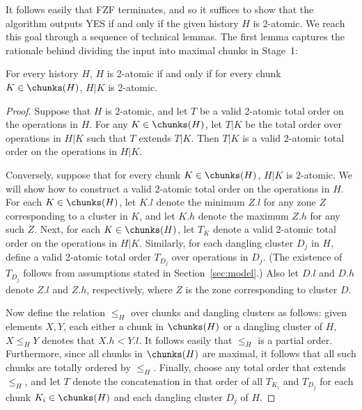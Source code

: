 



It follows easily that FZF terminates, and so it suffices to show that
the algorithm outputs YES if and only if the given history $H$ is 2-atomic.
We reach this goal through a sequence of technical lemmas.
The first lemma captures the rationale behind dividing the input into
maximal chunks in Stage~1:

\begin{lemma}
  \label{lemma:subdivide}
  For every history $H$, $H$ is 2-atomic if and only if for every chunk
  $K \in \chunks(H)$, $H|K$ is 2-atomic.
\begin{proof} Suppose that $H$ is 2-atomic, and let $T$ be a valid 2-atomic total order
on the operations in $H$.
For any $K \in \chunks(H)$, let $T|K$ be the total order over operations
in $H|K$ such that $T$ extends $T|K$.
Then $T|K$ is a valid 2-atomic total order on the operations in $H|K$.


Conversely, suppose that for every chunk $K \in \chunks(H)$, $H|K$ is 2-atomic.
We will show how to construct a valid 2-atomic total order on the operations in $H$.
For each $K \in \chunks(H)$, let $K.l$ denote the minimum $Z.l$ for any zone $Z$
corresponding to a cluster in $K$, and let $K.h$ denote the maximum $Z.h$ 
for any such $Z$.
Next, for each $K \in \chunks(H)$, let $T_K$ denote a valid 2-atomic total order on the
operations in $H|K$.
Similarly, for each dangling cluster $D_j$ in $H$, define a valid 2-atomic total order $T_{D_j}$ over operations in $D_j$.
(The existence of $T_{D_j}$ follows from assumptions stated in Section~\ref{sec:model}.)
Also let $D.l$ and $D.h$ denote $Z.l$ and $Z.h$, respectively, where $Z$ is the zone corresponding
to cluster $D$.

Now define the relation $\leq_H$ over chunks and dangling clusters as follows:
given elements $X,Y$, each either a chunk in $\chunks(H)$ or a dangling cluster of $H$,
$X \leq_H Y$ denotes that $X.h < Y.l$.
It follows easily that $\leq_H$ is a partial order.
Furthermore, since all chunks in $\chunks(H)$ are maximal, it follows that all
such chunks are totally ordered by $\leq_H$.
Finally, choose any total order that extends $\leq_H$, and let $T$ denote the concatenation
in that order of all $T_{K_i}$ and $T_{D_j}$ for each chunk $K_i \in \chunks(H)$ and 
each dangling cluster $D_j$ of $H$.


\end{proof}
\end{lemma}
